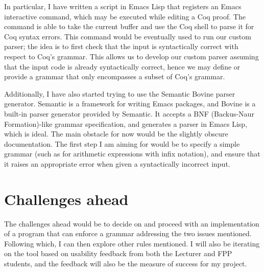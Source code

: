 In particular, I have written a script in Emacs Lisp that registers an Emacs interactive command, which may be executed while editing a Coq proof. The command is able to take the current buffer and use the Coq shell to parse it for Coq syntax errors. This command would be eventually used to run our custom parser; the idea is to first check that the input is syntactically correct with respect to Coq's grammar. This allows us to develop our custom parser assuming that the input code is already syntactically correct, hence we may define or provide a grammar that only encompasses a subset of Coq's grammar.

Additionally, I have also started trying to use the Semantic Bovine parser generator. Semantic is a framework for writing Emacs packages, and Bovine is a built-in parser generator provided by Semantic. It accepts a BNF (Backus-Naur Formation)-like grammar specification, and generates a parser in Emacs Lisp, which is ideal. The main obstacle for now would be the slightly obscure documentation. The first step I am aiming for would be to specify a simple grammar (such as for arithmetic expressions with infix notation), and ensure that it raises an appropriate error when given a syntactically incorrect input. 

\section{Challenges ahead}
The challenges ahead would be to decide on and proceed with an implementation of a program that can enforce a grammar addressing the two issues mentioned. Following which, I can then explore other rules mentioned. I will also be iterating on the tool based on usability feedback from both the Lecturer and FPP students, and the feedback will also be the measure of success for my project.